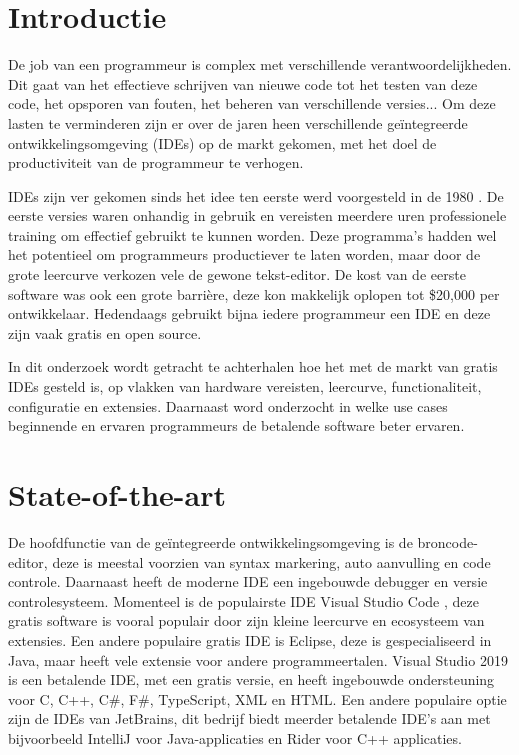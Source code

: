 
\section{Introductie} %
\label{sec:introductie}

De job van een programmeur is complex met verschillende verantwoordelijkheden. Dit gaat van het effectieve schrijven van nieuwe code tot het testen van deze code, het opsporen van fouten, het beheren van verschillende versies... Om deze lasten te verminderen zijn er over de jaren heen verschillende geïntegreerde ontwikkelingsomgeving (IDEs) op de markt gekomen, met het doel de productiviteit van de programmeur te verhogen. 

IDEs zijn ver gekomen sinds het idee ten eerste werd voorgesteld in de 1980 \autocite{Kline2005}. De eerste versies waren onhandig in gebruik en vereisten meerdere uren professionele training om effectief gebruikt te kunnen worden. Deze programma’s hadden wel het potentieel om programmeurs productiever te laten worden, maar door de grote leercurve verkozen vele de gewone tekst-editor. De kost van de eerste software was ook een grote barrière, deze kon makkelijk oplopen tot \$20,000 per ontwikkelaar. Hedendaags gebruikt bijna iedere programmeur een IDE en deze zijn vaak gratis en open source. 

In dit onderzoek wordt getracht te achterhalen hoe het met de markt van gratis IDEs gesteld is, op vlakken van hardware vereisten, leercurve, functionaliteit, configuratie en extensies. Daarnaast word onderzocht in welke use cases beginnende en ervaren programmeurs de betalende software beter ervaren.


\section{State-of-the-art}
\label{sec:state-of-the-art}

De hoofdfunctie van de geïntegreerde ontwikkelingsomgeving is de broncode-editor, deze is meestal voorzien van syntax markering, auto aanvulling en code controle. Daarnaast heeft de moderne IDE een ingebouwde debugger en versie controlesysteem. Momenteel is de populairste IDE Visual Studio Code \autocite{StackOverflow2021}, deze gratis software is vooral populair door zijn kleine leercurve en ecosysteem van extensies. Een andere populaire gratis IDE is Eclipse, deze is gespecialiseerd in Java, maar heeft vele extensie voor andere programmeertalen. Visual Studio 2019 is een betalende IDE, met een gratis versie, en heeft ingebouwde ondersteuning voor C, C++, C\#, F\#, TypeScript, XML en HTML. Een andere populaire optie zijn de IDEs van JetBrains, dit bedrijf biedt meerder betalende IDE’s aan met bijvoorbeeld IntelliJ voor Java-applicaties en Rider voor C++ applicaties.

